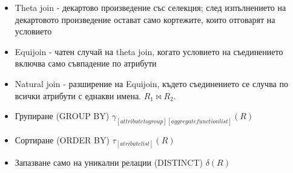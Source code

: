 \documentclass[fleqn,12pt]{article}
\begin{document}
\begin{itemize}
	\item Theta join - декартово произведение със селекция; след изпълнението на декартовото произведение остават само кортежите, които отговарят на условието
	\item Equijoin - чатен случай на theta join, когато условието на съединението включва само съвпадение по атрибути
    \item Natural join - разширение на Equijoin, където съединението се случва по всички атрибути с еднакви имена. $R_1 \bowtie  R_2$. 
    \item Групиране (GROUP BY) $\gamma_{[attribute to group][aggregate function list]}(R)$
    \item Сортиране (ORDER BY) $\tau_{[atribute list]}(R)$
    \item Запазване само на уникални релации (DISTINCT) $\delta(R)$
\end{itemize}
\end{document}

